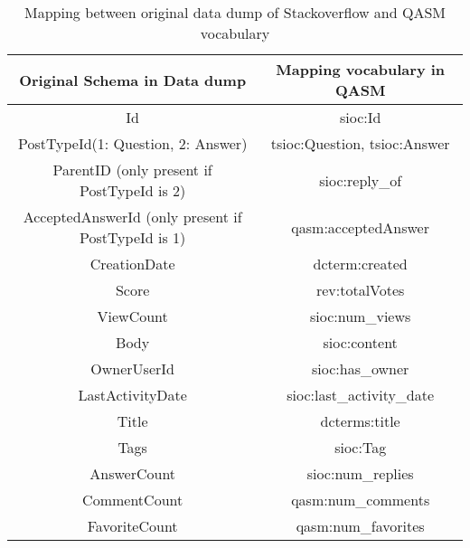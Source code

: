 \begin{sidewaystable}
    \centering
    \begin{tabular}{|c|c|}
    \hline
    Original Schema in Data dump & Mapping vocabulary in QASM \\ \hline
        Id       &  sioc:Id \\ \hline
        PostTypeId(1: Question, 2: Answer) & tsioc:Question, tsioc:Answer   \\ \hline
        ParentID (only present if PostTypeId is 2) & sioc:reply\_of   \\ \hline
        AcceptedAnswerId (only present if PostTypeId is 1) & qasm:acceptedAnswer  \\ \hline 
        CreationDate & dcterm:created \\ \hline
        Score & rev:totalVotes \\ \hline
        ViewCount & sioc:num\_views \\ \hline
        Body & sioc:content \\ \hline %
        OwnerUserId & sioc:has\_owner \\ \hline
        LastActivityDate & sioc:last\_activity\_date\\ \hline
        Title & dcterms:title\\ \hline
        Tags & sioc:Tag\\ \hline
        AnswerCount & sioc:num\_replies\\ \hline
        CommentCount & qasm:num\_comments\\ \hline
        FavoriteCount & qasm:num\_favorites\\ \hline
    \end{tabular}
    \caption{Mapping between original data dump of Stackoverflow and QASM vocabulary}
    \label{tab:mappingstackoverflow}
\end{sidewaystable}

